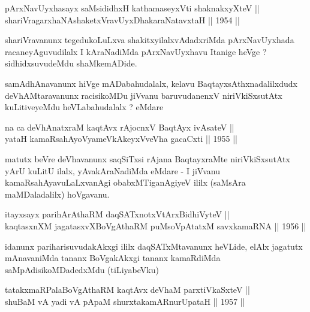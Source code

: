 
\begin{shl}
pArxNavUyxhasayx saMsididhxH kathamaseyxVti shaknakxyXteV || \\
shariVragarxhaNAshaketxVravUyxDhakaraNatavxtaH \hfill || 1954 ||
  
\end{shl}

\begin{artha}
shariVravanunx tegedukoLuLxva shakitxyilalxvAdadxriMda
pArxNavUyxhada racaneyAguvudilalx I kAraNadiMda
pArxNavUyxhavu Itanige heVge ? sidhidxsuvudeMdu shaMkemADide.
\end{artha}

\begin{artha}
samAdhAnavanunx hiVge mADabahudalalx, kelavu BaqtayxsAthxnadalilxdudx
deVhAMtaravanunx racisikoMDu jiVvanu baruvudanenxV niriVkiSxsutAtx
kuLitiveyeMdu heVLabahudalalx ? eMdare
\end{artha}


\begin{shl}
na ca deVhAnatxraM kaqtAvx rAjocnxV BaqtAyx ivA\s \s sateV || \\
yataH kamaRsahAyoV\s yameVkAkeyxVveVha gacaCxti \hfill || 1955 ||
  
\end{shl}

\begin{artha}
matutx beVre deVhavanunx saqSiTxsi rAjana BaqtayxraMte niriVkiSxsutAtx
yArU kuLitU ilalx, yAvakAraNadiMda eMdare - I jiVvanu
kamaRsahAyavuLaLxvanAgi obabxMTiganAgiyeV ililx (saMsAra maMDaladalilx) hoVgavanu.
\end{artha}


\begin{shl}
itayxsayx parihArAthaRM daqSATxnotxV\s tArxBidhiVyteV ||  \\
kaqtasxnXM jagatasxvXBoVgAthaRM puMsoVpAtatxM savxkamaRNA \hfill || 1956 ||
  
\end{shl}

\begin{artha}
idanunx pariharisuvudakAkxgi ililx daqSATxMtavanunx heVLide, elAlx
jagatutx mAnavaniMda tananx BoVgakAkxgi tananx kamaRdiMda
saMpAdisikoMDadedxMdu (tiLiyabeVku)
\end{artha}

\begin{shl}
tatakxmaRPalaBoVgAthaRM kaqtAvx deVhaM parxtiVkaSxteV ||  \\
shuBaM vA yadi vA pApaM shurxtakamARnurUpataH \hfill || 1957 ||
  
\end{shl}

